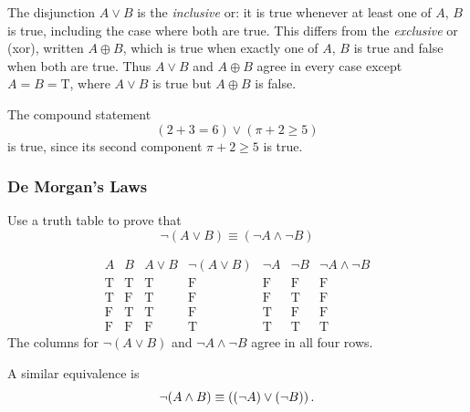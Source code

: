 \begin{remark}
    The disjunction $A \vee B$ is the \emph{inclusive} or: it is true whenever at least one of $A$, $B$ is true, including the case where both are true. This differs from the \emph{exclusive} or (xor), written $A \oplus B$, which is true when exactly one of $A$, $B$ is true and false when both are true. Thus $A \vee B$ and $A \oplus B$ agree in every case except $A = B = \mathrm{T}$, where $A \vee B$ is true but $A \oplus B$ is false.
\end{remark}

\begin{example}
    The compound statement
    \begin{equation*}
        (2 + 3 = 6) \vee (\pi + 2 \geq 5)
    \end{equation*}
    is true, since its second component $\pi + 2 \geq 5$ is true.
\end{example}

\subsubsection{De Morgan's Laws}
\begin{example}
    Use a truth table to prove that
    \begin{equation*}
        \neg (A \vee B) \equiv (\neg A \wedge \neg B)
    \end{equation*}

    \[
    \begin{array}{c|c|c|c|c|c|c}
    A & B & A\vee B & \neg(A\vee B) & \neg A & \neg B & \neg A\wedge\neg B\\
    \hline
    \mathrm{T} & \mathrm{T} & \mathrm{T} & \mathrm{F} & \mathrm{F} & \mathrm{F} & \mathrm{F}\\
    \mathrm{T} & \mathrm{F} & \mathrm{T} & \mathrm{F} & \mathrm{F} & \mathrm{T} & \mathrm{F}\\
    \mathrm{F} & \mathrm{T} & \mathrm{T} & \mathrm{F} & \mathrm{T} & \mathrm{F} & \mathrm{F}\\
    \mathrm{F} & \mathrm{F} & \mathrm{F} & \mathrm{T} & \mathrm{T} & \mathrm{T} & \mathrm{T}
    \end{array}
    \]
    The columns for $\neg(A \vee B)$ and $\neg A \wedge \neg B$ agree in all four rows.
\end{example}

A similar equivalence is
\begin{equation*}
    \neg (A \wedge B) \equiv \left(\left(\neg A\right) \vee \left(\neg B\right)\right).
\end{equation*}

